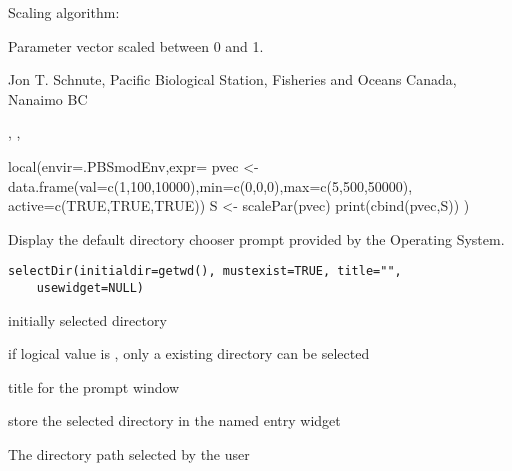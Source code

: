 \documentclass[letterpaper]{book}
\begin{document}
%
\begin{Details}\relax
Scaling algorithm:  
\end{Details}
%
\begin{Value}
Parameter vector scaled between 0 and 1.
\end{Value}
%
\begin{Author}\relax
Jon T. Schnute, Pacific Biological Station, Fisheries and Oceans Canada, Nanaimo BC
\end{Author}
%
\begin{SeeAlso}\relax
{}, , 
\end{SeeAlso}
%
\begin{Examples}
\begin{ExampleCode}
local(envir=.PBSmodEnv,expr={
  pvec <- data.frame(val=c(1,100,10000),min=c(0,0,0),max=c(5,500,50000),
    active=c(TRUE,TRUE,TRUE))
  S    <- scalePar(pvec)
  print(cbind(pvec,S))
})
\end{ExampleCode}
\end{Examples}
%
\begin{Description}\relax
Display the default directory chooser prompt provided by the Operating System.
\end{Description}
%
\begin{Usage}
\begin{verbatim}
selectDir(initialdir=getwd(), mustexist=TRUE, title="", 
    usewidget=NULL)
\end{verbatim}
\end{Usage}
%
\begin{Arguments}
\begin{ldescription}
\item[\code{initialdir}] initially selected directory
\item[\code{mustexist}] if logical value is , only a existing directory can be selected
\item[\code{title}] title for the prompt window
\item[\code{usewidget}] store the selected directory in the named entry widget
\end{ldescription}
\end{Arguments}
%
\begin{Value}
The directory path selected by the user
\end{Value}
\end{document}
